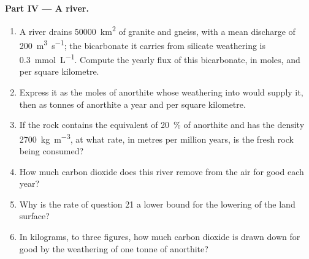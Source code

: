 \begin{problem}
\medskip
\noindent\textbf{Part IV --- A river.}
\begin{enumerate}[resume]
  \item A river drains \qty{50000}{km^2} of granite and gneiss, with a mean
        discharge of \qty{200}{m^3.s^{-1}}; the bicarbonate it carries from
        silicate weathering is \qty{0.3}{mmol.L^{-1}}. Compute the yearly flux
        of this bicarbonate, in moles, and per square kilometre.
  \item Express it as the moles of anorthite whose weathering into 
        would supply it, then as tonnes of anorthite a year and per square
        kilometre.
  \item If the rock contains the equivalent of \qty{20}{\percent} of
        anorthite and has the density \qty{2700}{kg.m^{-3}}, at what rate, in
        metres per million years, is the fresh rock being consumed?
  \item How much carbon dioxide does this river remove from the air for good
        each year?
  \item Why is the rate of question 21 a lower bound for the lowering of the
        land surface?
  \item In kilograms, to three figures, how much carbon dioxide is drawn down
        for good by the weathering of one tonne of anorthite?
\end{enumerate}
\end{problem}
